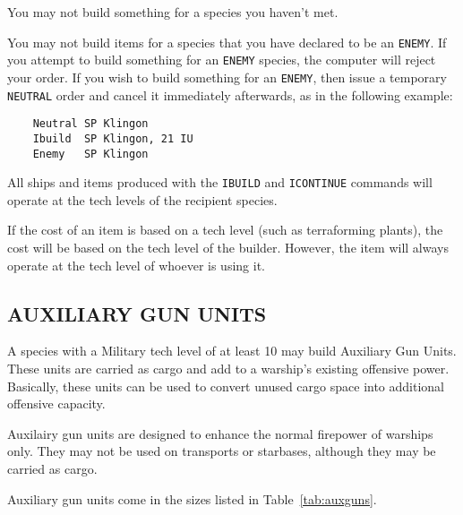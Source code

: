 \documentclass[10pt,titlepage]{article}
\begin{document}
You may not build something for a species you haven't met.

You may not build items for a species that you have declared to be an \texttt{ENEMY}.
If you attempt to build something for an \texttt{ENEMY} species, the computer will
reject your order.  If you wish to build something for an \texttt{ENEMY}, then issue
a temporary \texttt{NEUTRAL} order and cancel it immediately afterwards, as in the
following example:

\begin{verbatim}
	Neutral	SP Klingon
	Ibuild	SP Klingon, 21 IU
	Enemy	SP Klingon\end{verbatim} 

All ships and items produced with the \texttt{IBUILD} and \texttt{ICONTINUE} commands will
operate at the tech levels of the recipient species.

If the cost of an item is based on a tech level (such as terraforming plants),
the cost will be based on the tech level of the builder.  However, the item
will always operate at the tech level of whoever is using it.

\newpage
\subsection{AUXILIARY GUN UNITS}

A species with a Military tech level of at least 10 may build Auxiliary Gun
Units.  These units are carried as cargo and add to a warship's existing
offensive power.  Basically, these units can be used to convert unused cargo
space into additional offensive capacity.

Auxilairy gun units are designed to enhance the normal firepower of warships
only.  They may not be used on transports or starbases, although they may be
carried as cargo.

Auxiliary gun units come in the sizes listed in Table~\ref{tab:auxguns}.
\end{document}
